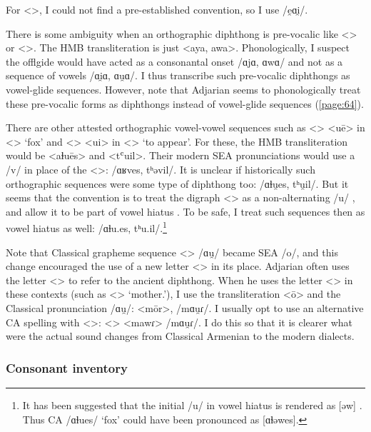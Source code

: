 \documentclass[output=paper]{langscibook}
\begin{document}
For <>, I could not find a pre-established convention, so I use /e̯ɑi̯/. 
	
There is some ambiguity when an orthographic diphthong is pre-vocalic like <> or <>. The HMB transliteration is just <aya, awa>. Phonologically, I suspect the offlgide would have acted as a consonantal onset /ɑjɑ, ɑwɑ/ and not as a sequence of vowels /ɑi̯ɑ, ɑu̯ɑ/. I thus transcribe such pre-vocalic diphthongs as vowel-glide sequences. However, note that Adjarian seems to phonologically treat these pre-vocalic forms as     diphthongs instead of vowel-glide sequences (\ref{page:64}). 




There are other attested orthographic vowel-vowel sequences such as <> <uē> in <> `fox' and <> <ui> in <> `to appear'. For these, the HMB transliteration would be <aɫuēs> and <tʿuil>. Their modern SEA pronunciations would use a /v/ in place of the <>: /ɑʁves, tʰəvil/. It is unclear if historically such orthographic sequences were some type of diphthong too: /ɑɫu̯es, tʰu̯il/. But it   seems that the convention is to treat the digraph <> as a non-alternating /u/ \citep[15]{Thomson-1989-IntroClassicalArmenian}, and allow it to be part of vowel hiatus \citep[17]{Thomson-1989-IntroClassicalArmenian}. To be safe, I treat such sequences then as vowel hiatus as well: /ɑɫu.es, tʰu.il/.\footnote{It has been suggested that the initial /u/ in vowel hiatus is rendered as [əw] \citep[13]{Kim-2021-phoneticsPhonologyOldArmenianWV}. Thus CA /ɑɫues/ `fox' could have been pronounced as [ɑɫəwes].}

Note that Classical grapheme sequence <> /ɑu̯/ became SEA /o/, and this change encouraged the use of a new letter <> in its place. Adjarian often uses the letter <> to refer to the ancient diphthong. When he   uses the letter <> in these contexts (such as <> `mother.{\gen}'), I use the transliteration <ō> and the Classical pronunciation /ɑu̯/: <mōr>, /mɑu̯ɾ/. I usually opt to use an alternative CA spelling with <>: <> <mawɾ> /mɑu̯ɾ/. I do this so that it is clearer what were the actual sound changes from Classical Armenian to the modern dialects. 


\subsubsection{Consonant inventory}\label{sec:HossepIntro:phonotransc:CA:cons}
\end{document}
